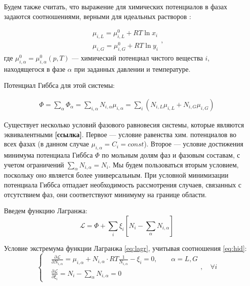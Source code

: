 \documentclass[12pt]{article}
\newcommand{\pd}[2]{\frac{\partial #1}{\partial #2}}
\begin{document}
Будем также считать, что выражение для химических потенциалов в фазах задаются соотношениями, верными для идеальных растворов \cite{Prigozhin}:

\begin{equation}
\begin{aligned}
\mu_{i,L} = \mu_{i,L}^0 + RT \ln x_i \\
\mu_{i,G} = \mu_{i,G}^0 + RT \ln y_i
\end{aligned},
\label{eq:hid}
\end{equation}
где $\mu_{i,\alpha}^0 = \mu_{i,\alpha}^0(p, T)$ --- химический потенциал чистого вещества $i$, находящегося в фазе $\alpha$ при заданных давлении и температуре.

Потенциал Гиббса для этой системы:

\begin{equation}
\begin{aligned}
\Phi = \sum_\alpha \Phi_\alpha = \sum_{i, \alpha}{N_{i,\alpha} \mu_{i,\alpha}} = \sum_i \left(N_{i, L} \mu_{i, L} +
N_{i, G} \mu_{i, G}\right)
\end{aligned}
\label{eq:gibbs}
\end{equation}

Существует несколько условий фазового равновесия системы, которые являются эквивалентными \textbf{[ссылка]}. Первое --- условие равенства хим. потенциалов во всех фазах (в данном случае $\mu_{i, \alpha} = C_i = const$). Второе --- условие достижения минимума потенциала Гиббса $\Phi$ по мольным долям фаз и фазовым составам, с учетом ограничений $\sum_\alpha N_{i, \alpha} = N_i$. Мы будем пользоваться вторым условием, поскольку оно является более универсальным. При условной минимизации потенциала Гиббса отпадает необходимость рассмотрения случаев, связанных с отсутствием фаз, они соответствуют минимуму на границе области.

Введем функцию Лагранжа:
\begin{equation}
\mathscr{L} = \Phi + \sum_i{\xi_i \left[N_i - \sum_\alpha N_{i, \alpha} \right]} \label{eq:lagr}
\end{equation}


Условие экстремума функции Лагранжа \eqref{eq:lagr}, учитывая соотношения \eqref{eq:hid}:
\[
\left\{
\begin{aligned}
& \pd{\mathscr{L}}{N_{i, \alpha}} = \mu_{i, \alpha} + N_{i, \alpha} \cdot RT \frac{1}{N_{i, \alpha}} - \xi_i = 0, \qquad \alpha=L, G \\
& \pd{\mathscr{L}}{\xi_i} = N_i - \sum_{\alpha} N_{i,\alpha} = 0
\end{aligned}
\right.,\quad\forall i
\]
\end{document}

